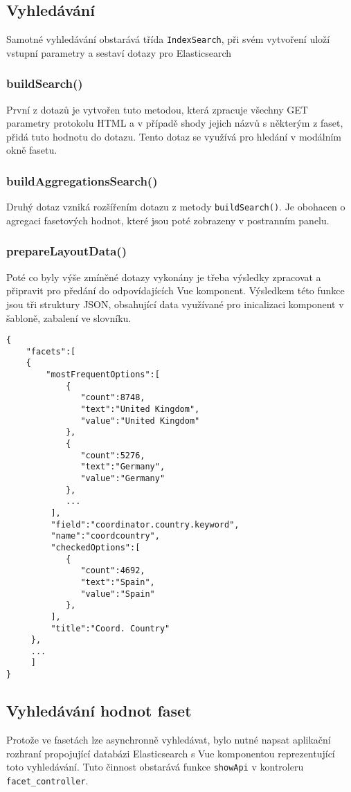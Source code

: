 \subsection{Vyhledávání}
Samotné vyhledávání obstarává třída \texttt{IndexSearch}, při svém vytvoření uloží vstupní parametry a sestaví dotazy pro Elasticsearch

\subsubsection*{buildSearch()}
První z dotazů je vytvořen tuto metodou, která zpracuje všechny GET parametry protokolu HTML a v případě shody jejich názvů s některým z faset, přidá tuto hodnotu do dotazu. Tento dotaz se využívá pro hledání v modálním okně fasetu. 

\subsubsection*{buildAggregationsSearch()}
Druhý dotaz vzniká rozšířením dotazu z metody \texttt{buildSearch()}. Je obohacen o agregaci fasetových hodnot, které jsou poté zobrazeny v postranním panelu.

\subsubsection*{prepareLayoutData()}
Poté co byly výše zmíněné dotazy vykonány je třeba výsledky zpracovat a připravit pro předání do odpovídajících Vue komponent. Výsledkem této funkce jsou tři struktury JSON, obsahující data využívané pro inicalizaci komponent v šabloně, zabalení ve slovníku.

\begin{verbatim}
{
    "facets":[
    {
        "mostFrequentOptions":[  
            {  
               "count":8748,
               "text":"United Kingdom",
               "value":"United Kingdom"
            },
            {  
               "count":5276,
               "text":"Germany",
               "value":"Germany"
            },
            ...
         ],
         "field":"coordinator.country.keyword",
         "name":"coordcountry",
         "checkedOptions":[  
            {  
               "count":4692,
               "text":"Spain",
               "value":"Spain"
            },
         ],
         "title":"Coord. Country"
     },
     ...
     ]
}
\end{verbatim}

\subsection{Vyhledávání hodnot faset}
Protože ve fasetách lze asynchronně vyhledávat, bylo nutné napsat aplikační rozhraní propojující databázi Elasticsearch s Vue komponentou reprezentující toto vyhledávání. Tuto činnost obstarává funkce \texttt{showApi} v kontroleru \texttt{facet\_controller}.

